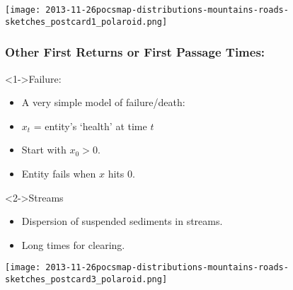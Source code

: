 
\begin{frame}
  \texttt{[image: 2013-11-26pocsmap-distributions-mountains-roads-sketches\_postcard1\_polaroid.png]}
\end{frame}


\begin{frame}
  \frametitle{Other First Returns or First Passage Times:}

  \begin{block}<1->{Failure:}
    \begin{itemize}
    \item A very simple model of failure/death:\cite{weitz2001a}
    \item $x_t$ = entity's `health' at time $t$
    \item Start with $x_0 > 0$.
    \item Entity fails when $x$ hits 0.
    \end{itemize}
  \end{block}

  \bigskip

  \begin{block}<2->{Streams}
    \begin{itemize}
    \item
      Dispersion of suspended sediments in streams.
    \item 
      Long times for clearing.
    \end{itemize}
  \end{block}

\end{frame}




\begin{frame}
  \texttt{[image: 2013-11-26pocsmap-distributions-mountains-roads-sketches\_postcard3\_polaroid.png]}
\end{frame}


